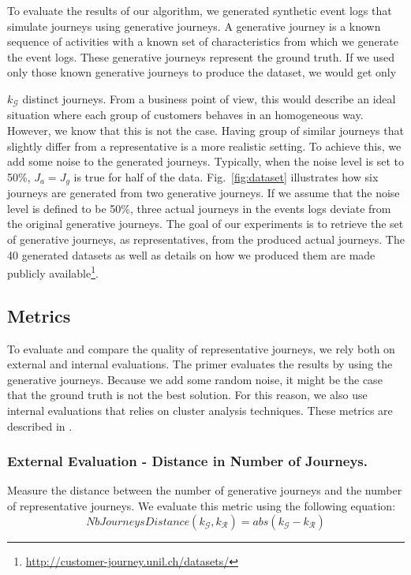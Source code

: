 \documentclass[runningheads]{llncs}
\begin{document}
{{To evaluate the results of our algorithm, we generated synthetic event logs that simulate journeys using generative journeys. A generative journey is a known sequence of activities with a known set of characteristics from which we generate the event logs. These generative journeys represent the ground truth. If we used only those known generative journeys to produce the dataset, we would get only {$k_{\mathcal{G}}$ distinct journeys. From a business point of view, this would describe an ideal situation where each group of customers behaves in an homogeneous way. However, we know that this is not the case. 
Having group of similar journeys that slightly differ from a representative is a more realistic setting. To achieve this, we add some noise to the generated journeys. Typically, when the noise level is set to 50\%, $J_a = J_g$ is true for half of the data. Fig.~\ref{fig:dataset} illustrates how six journeys are generated from two generative journeys. If we assume that the noise level is defined to be 50\%, three actual journeys in the events logs deviate from the original generative journeys. The goal of our experiments is to retrieve the set of generative journeys, as representatives, from the produced actual journeys. The 40 generated datasets as well as details on how we produced them are made publicly available\footnote{\url{http://customer-journey.unil.ch/datasets/}}.

\subsection{Metrics}
To evaluate and compare the quality of representative journeys, we rely both on external and internal evaluations. The primer evaluates the results by using the generative journeys. Because we add some random noise, it might be the case that the ground truth is not the best solution. For this reason, we also use internal evaluations that relies on cluster analysis techniques. These metrics are described in \cite{gabadinho2009extracting}.

\subsubsection{External Evaluation - Distance in Number of Journeys.} Measure the distance between the number of generative journeys and the number of representative journeys. We evaluate this metric using the following equation:
\begin{equation}
    NbJourneysDistance({k_{\mathcal{G}}}, {k_{\mathcal{R}}}) = abs({k_{\mathcal{G}}} - {k_{\mathcal{R}}}) 
\end{equation}

}}}
\end{document}
